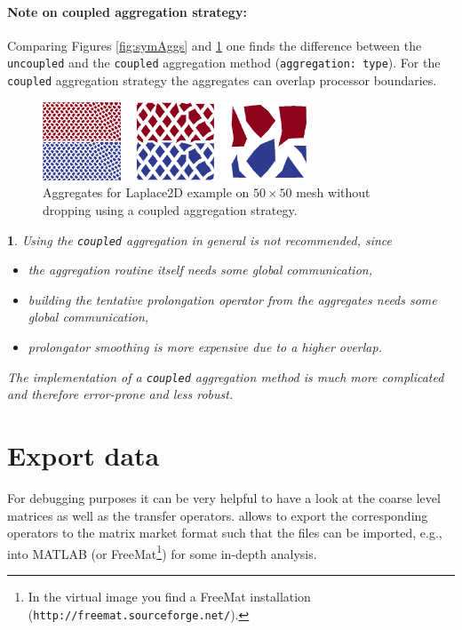 \documentclass[10pt,fleqn]{book}
\newtheorem*{mycomment}{\ding{42}}
\begin{document}
\paragraph{Note on coupled aggregation strategy:}
Comparing Figures \ref{fig:symAggs} and \ref{fig:nonsymAggsCoupled} one finds the difference between the \verb|uncoupled| and the \verb|coupled| aggregation method (\texttt{aggregation: type}). For the \verb|coupled| aggregation strategy the aggregates can overlap processor boundaries.
\begin{figure}
\centering
\includegraphics[width=0.7\textwidth]{pics/aggsSymmCoupled.png}
\caption{Aggregates for Laplace2D example on $50\times 50$ mesh without dropping using a coupled aggregation strategy.}
\label{fig:nonsymAggsCoupled}
\end{figure}

\begin{mycomment}
Using the \verb|coupled| aggregation in general is not recommended, since
\begin{itemize}
\item[-] the aggregation routine itself needs some global communication,
\item[-] building the tentative prolongation operator from the aggregates needs some global communication,
\item[-] prolongator smoothing is more expensive due to a higher overlap.
\end{itemize}
The implementation of a \verb|coupled| aggregation method is much more complicated and therefore error-prone and less robust.
\end{mycomment}



\section{Export data}
\label{sec:exportdatasimple}
For debugging purposes it can be very helpful to have a look at the coarse level matrices as well as the transfer operators. \muelu allows to export the corresponding operators to the matrix market format such that the files can be imported, e.g., into MATLAB (or FreeMat\footnote{In the virtual image you find a FreeMat installation (\texttt{http://freemat.sourceforge.net/}).}) for some in-depth analysis.
\end{document}
